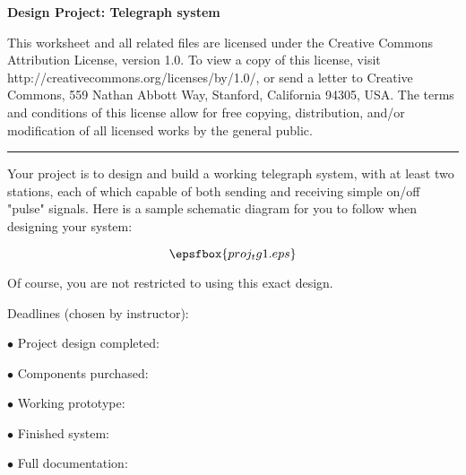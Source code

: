 
\centerline{\bf Design Project: Telegraph system} \bigskip 
 
This worksheet and all related files are licensed under the Creative Commons Attribution License, version 1.0.  To view a copy of this license, visit http://creativecommons.org/licenses/by/1.0/, or send a letter to Creative Commons, 559 Nathan Abbott Way, Stanford, California 94305, USA.  The terms and conditions of this license allow for free copying, distribution, and/or modification of all licensed works by the general public.

\bigskip 

\hrule

\vskip 10pt

Your project is to design and build a working telegraph system, with at least two stations, each of which capable of both sending and receiving simple on/off "pulse" signals.  Here is a sample schematic diagram for you to follow when designing your system:

$$\epsfbox{proj_tg1.eps}$$

Of course, you are not restricted to using this exact design.

\vskip 10pt

\noindent
Deadlines (chosen by instructor):

\medskip
\item{$\bullet$} Project design completed: 
\item{$\bullet$} Components purchased:
\item{$\bullet$} Working prototype:
\item{$\bullet$} Finished system:
\item{$\bullet$} Full documentation:
\medskip




